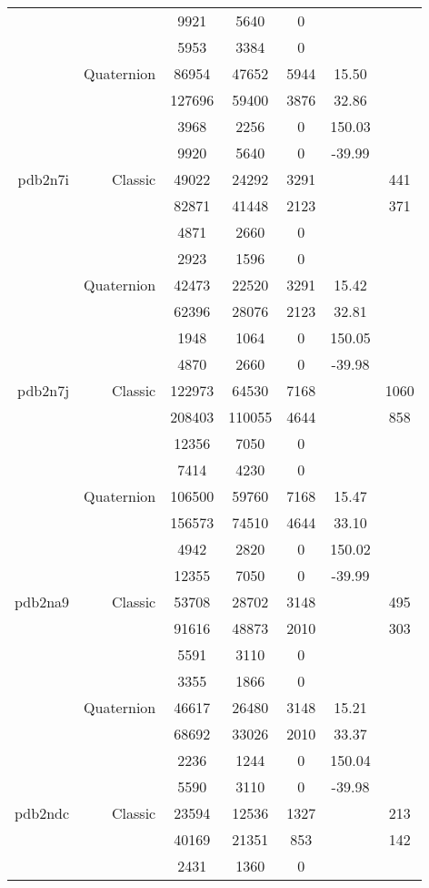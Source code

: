 \begin{xltabular}{\textwidth}{r|rcccSc}
& & 9921 & 5640 & 0 & & \\
& & 5953 & 3384 & 0 & & \\
& Quaternion & 86954 & 47652 & 5944 & 15.50 & \\
& & 127696 & 59400 & 3876 & 32.86 & \\
& & 3968 & 2256 & 0 & 150.03 & \\
& & 9920 & 5640 & 0 & -39.99 & \\ \addlinespace
pdb2n7i & Classic & 49022 & 24292 & 3291 & & 441 \\
& & 82871 & 41448 & 2123 & & 371 \\
& & 4871 & 2660 & 0 & & \\
& & 2923 & 1596 & 0 & & \\
& Quaternion & 42473 & 22520 & 3291 & 15.42 & \\
& & 62396 & 28076 & 2123 & 32.81 & \\
& & 1948 & 1064 & 0 & 150.05 & \\
& & 4870 & 2660 & 0 & -39.98 & \\ \addlinespace
pdb2n7j & Classic & 122973 & 64530 & 7168 & & 1060 \\
& & 208403 & 110055 & 4644 & & 858 \\
& & 12356 & 7050 & 0 & & \\
& & 7414 & 4230 & 0 & & \\
& Quaternion & 106500 & 59760 & 7168 & 15.47 & \\
& & 156573 & 74510 & 4644 & 33.10 & \\
& & 4942 & 2820 & 0 & 150.02 & \\
& & 12355 & 7050 & 0 & -39.99 & \\ \addlinespace
pdb2na9 & Classic & 53708 & 28702 & 3148 & & 495 \\
& & 91616 & 48873 & 2010 & & 303 \\
& & 5591 & 3110 & 0 & & \\
& & 3355 & 1866 & 0 & & \\
& Quaternion & 46617 & 26480 & 3148 & 15.21 & \\
& & 68692 & 33026 & 2010 & 33.37 & \\
& & 2236 & 1244 & 0 & 150.04 & \\
& & 5590 & 3110 & 0 & -39.98 & \\ \addlinespace
pdb2ndc & Classic & 23594 & 12536 & 1327 & & 213 \\
& & 40169 & 21351 & 853 & & 142 \\
& & 2431 & 1360 & 0 & & \\

\end{xltabular}
